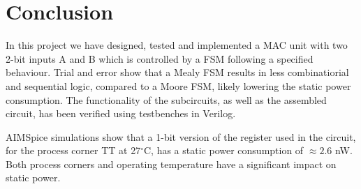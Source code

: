 \section{Conclusion}
\label{sec:conclution}

In this project we have designed, tested and implemented a MAC unit with two 2-bit inputs A and B which is controlled by a FSM following a specified behaviour. Trial and error show that a Mealy FSM results in less combinatiorial and sequential logic, compared to a Moore FSM, likely lowering the static power consumption. The functionality of the subcircuits, as well as the assembled circuit, has been verified using testbenches in Verilog. 

AIMSpice simulations show that a 1-bit version of the register used in the circuit, for the process corner TT at 27$^\circ$C, has a static power consumption of $\approx2.6$ nW. Both process corners and operating temperature have a significant impact on static power.

 



